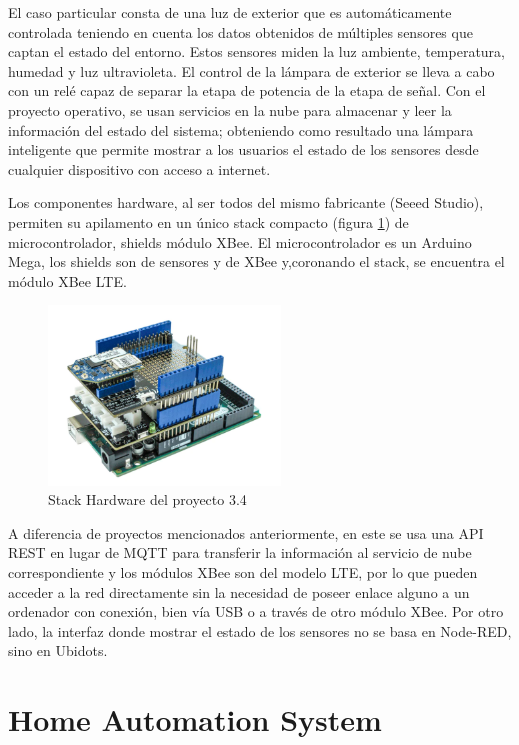 El caso particular consta de una luz de exterior que es automáticamente controlada teniendo en cuenta los datos obtenidos de múltiples sensores que captan el estado del entorno. Estos sensores miden la luz ambiente, temperatura, humedad y luz ultravioleta. El control de la lámpara de exterior se lleva a cabo con un relé capaz de separar la etapa de potencia de la etapa de señal. Con el proyecto operativo, se usan servicios en la nube para almacenar y leer la información del estado del sistema; obteniendo como resultado una lámpara inteligente que permite mostrar a los usuarios el estado de los sensores desde cualquier dispositivo con acceso a internet.

Los componentes hardware, al ser todos del mismo fabricante (Seeed Studio), permiten su apilamento en un único stack compacto (figura \ref{fig:EArte4}) de microcontrolador, shields módulo XBee. El microcontrolador es un Arduino Mega, los shields son de sensores y de XBee y,coronando el stack, se encuentra el módulo XBee LTE.

\begin{figure}[t]
\centering
\includegraphics[width=0.55\textwidth]{figuras/EArte4.png}
\caption{Stack Hardware del proyecto 3.4}
\label{fig:EArte4}
\end{figure}

A diferencia de proyectos mencionados anteriormente, en este se usa una API REST en lugar de MQTT para transferir la información al servicio de nube correspondiente y los módulos XBee son del modelo LTE, por lo que pueden acceder a la red directamente sin la necesidad de poseer enlace alguno a un ordenador con conexión, bien vía USB o a través de otro módulo XBee. Por otro lado, la interfaz donde mostrar el estado de los sensores no se basa en Node-RED, sino en Ubidots.

\section{Home Automation System \cite{Molnar:Digi}}

